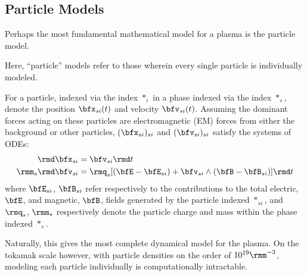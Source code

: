 \subsection{Particle Models}\label{cha:particle models}
    Perhaps the most fundamental mathematical model for a plasma is the particle model.

    \line

    \begin{definition}\label{def:particle model}
        Here, ``particle'' models refer to those wherein every single particle is individually modeled.
    \end{definition}
    
    \line

    For a particle, indexed via the index $*_{i}$ in a phase indexed via the index $*_{s}$, denote the position $\bfx_{si}(t)$ and velocity $\bfv_{si}(t)$. Assuming the dominant forces acting on these particles are electromagnetic (EM) forces from either the background or other particles, $(\bfx_{si})_{si}$ and $(\bfv_{si})_{si}$ satisfy the systems of ODEs:
    \begin{align}
        \rmd\bfx_{si}  &=  \bfv_{si}\rmd t  \label{eqn:particle motion}  \\
        \rmm_{s}\rmd\bfv_{si}  &=  \rmq_{s}[(\bfE - \bfE_{si}) + \bfv_{si}\wedge(\bfB - \bfB_{si})]\rmd t  \label{eqn:particle forcing}
    \end{align}
    where $\bfE_{si}$, $\bfB_{si}$ refer respectively to the contributions to the total electric, $\bfE$, and magnetic, $\bfB$, fields generated by the particle indexed $*_{si}$, and $\rmq_{s}$, $\rmm_{s}$ respectively denote the particle charge and mass within the phase indexed $*_{s}$.

    
    Naturally, this gives the most complete dynamical model for the plasma. On the tokamak scale however, with particle densities on the order of $10^{19}\rmm^{- 3}$, modeling each particle individually is computationally intractable.
    